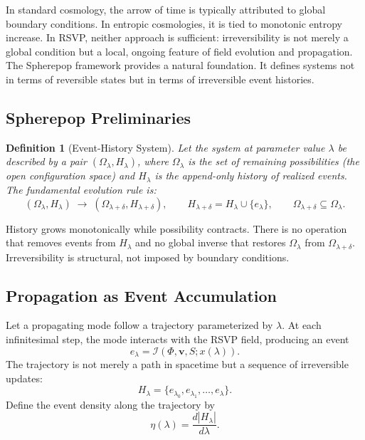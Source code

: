\documentclass[12pt,a4paper]{article}
\newtheorem{definition}[theorem]{Definition}
\theoremstyle{remark}
\newcommand{\vv}{\mathbf{v}}
\begin{document}
In standard cosmology, the arrow of time is typically attributed to global boundary conditions. In entropic cosmologies, it is tied to monotonic entropy increase. In RSVP, neither approach is sufficient: irreversibility is not merely a global condition but a local, ongoing feature of field evolution and propagation. The Spherepop framework provides a natural foundation. It defines systems not in terms of reversible states but in terms of irreversible event histories.

\subsection{Spherepop Preliminaries}

\begin{definition}[Event-History System]
Let the system at parameter value $\lambda$ be described by a pair $(\Omega_\lambda, H_\lambda)$, where $\Omega_\lambda$ is the set of remaining possibilities (the open configuration space) and $H_\lambda$ is the append-only history of realized events. The fundamental evolution rule is:
\begin{equation}
(\Omega_\lambda, H_\lambda) \;\longrightarrow\; (\Omega_{\lambda+\delta}, H_{\lambda+\delta}),
\qquad
H_{\lambda+\delta} = H_\lambda \cup \{e_\lambda\},
\qquad
\Omega_{\lambda+\delta} \subseteq \Omega_\lambda.
\end{equation}
\end{definition}
History grows monotonically while possibility contracts. There is no operation that removes events from $H_\lambda$ and no global inverse that restores $\Omega_\lambda$ from $\Omega_{\lambda+\delta}$. Irreversibility is structural, not imposed by boundary conditions.

\subsection{Propagation as Event Accumulation}

Let a propagating mode follow a trajectory parameterized by $\lambda$. At each infinitesimal step, the mode interacts with the RSVP field, producing an event
\begin{equation}
e_\lambda = \mathcal{I}(\Phi, \vv, S; x(\lambda)).
\end{equation}
The trajectory is not merely a path in spacetime but a sequence of irreversible updates:
\begin{equation}
H_\lambda = \{e_{\lambda_0}, e_{\lambda_1}, \ldots, e_\lambda\}.
\end{equation}
Define the event density along the trajectory by
\begin{equation}
\eta(\lambda) = \frac{d|H_\lambda|}{d\lambda}.
\end{equation}
\end{document}
